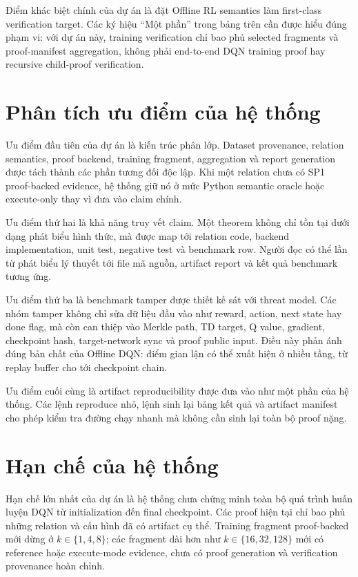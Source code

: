 \documentclass[12pt,a4paper,oneside]{report}
\begin{document}
Điểm khác biệt chính của dự án là đặt Offline RL semantics làm first-class verification target. Các ký hiệu ``Một phần'' trong bảng trên cần được hiểu đúng phạm vi: với dự án này, training verification chỉ bao phủ selected fragments và proof-manifest aggregation, không phải end-to-end DQN training proof hay recursive child-proof verification.

\section{Phân tích ưu điểm của hệ thống}

Ưu điểm đầu tiên của dự án là kiến trúc phân lớp. Dataset provenance, relation semantics, proof backend, training fragment, aggregation và report generation được tách thành các phần tương đối độc lập. Khi một relation chưa có SP1 proof-backed evidence, hệ thống giữ nó ở mức Python semantic oracle hoặc execute-only thay vì đưa vào claim chính.

Ưu điểm thứ hai là khả năng truy vết claim. Một theorem không chỉ tồn tại dưới dạng phát biểu hình thức, mà được map tới relation code, backend implementation, unit test, negative test và benchmark row. Người đọc có thể lần từ phát biểu lý thuyết tới file mã nguồn, artifact report và kết quả benchmark tương ứng.

Ưu điểm thứ ba là benchmark tamper được thiết kế sát với threat model. Các nhóm tamper không chỉ sửa dữ liệu đầu vào như reward, action, next state hay done flag, mà còn can thiệp vào Merkle path, TD target, Q value, gradient, checkpoint hash, target-network sync và proof public input. Điều này phản ánh đúng bản chất của Offline DQN: điểm gian lận có thể xuất hiện ở nhiều tầng, từ replay buffer cho tới checkpoint chain.

Ưu điểm cuối cùng là artifact reproducibility được đưa vào như một phần của hệ thống. Các lệnh reproduce nhỏ, lệnh sinh lại bảng kết quả và artifact manifest cho phép kiểm tra đường chạy nhanh mà không cần sinh lại toàn bộ proof nặng.

\section{Hạn chế của hệ thống}

Hạn chế lớn nhất của dự án là hệ thống chưa chứng minh toàn bộ quá trình huấn luyện DQN từ initialization đến final checkpoint. Các proof hiện tại chỉ bao phủ những relation và cấu hình đã có artifact cụ thể. Training fragment proof-backed mới dừng ở \(k \in \{1,4,8\}\); các fragment dài hơn như \(k \in \{16,32,128\}\) mới có reference hoặc execute-mode evidence, chưa có proof generation và verification provenance hoàn chỉnh.
\end{document}
